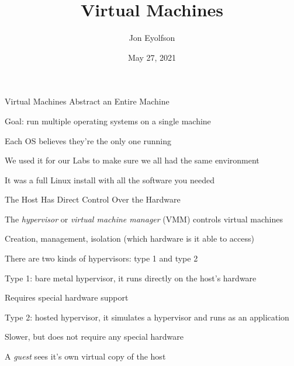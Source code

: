 

\title{Virtual Machines}
\author{Jon Eyolfson}
\date{May 27, 2021}


  \begin{frame}
    \titlepage
  \end{frame}

  \begin{frame}{Virtual Machines Abstract an Entire Machine}

    Goal: run multiple operating systems on a single machine

    \hspace{2em} Each OS believes they're the only one running

    \vspace{2em}

    We used it for our Labs to make sure we all had the same environment

    \hspace{2em} It was a full Linux install with all the software you needed
  \end{frame}

  \begin{frame}{The Host Has Direct Control Over the Hardware}

    The \textit{hypervisor} or \textit{virtual machine manager} (VMM) controls
    virtual machines

    \hspace{2em} Creation, management, isolation (which hardware is it able to
    access)

    \vspace{2em}

    There are two kinds of hypervisors: type 1 and type 2

    \hspace{2em} Type 1: bare metal hypervisor, it runs directly on the host's
    hardware

    \hspace{4em} Requires special hardware support

    \hspace{2em} Type 2: hosted hypervisor, it simulates a hypervisor and runs
                 as an application

    \hspace{4em} Slower, but does not require any special hardware

    \vspace{2em}

    A \textit{guest} sees it's own virtual copy of the host
  \end{frame}

